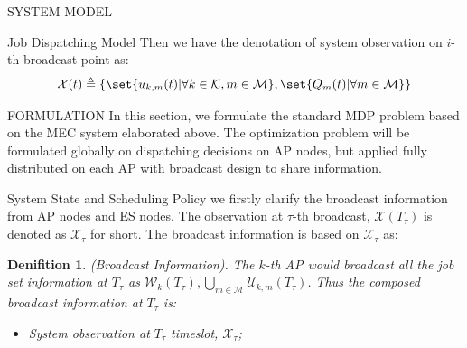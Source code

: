 \documentclass[10pt, conference, letterpaper]{IEEEtran}
\newtheorem{definition}{Denifition}
\newcommand{\define}{\triangleq}
\DeclarePairedDelimiter\set\{\}
\newcommand{\apSet}{\mathcal{K}}
\newcommand{\esSet}{\mathcal{M}}
\newcommand{\wSet}{\mathcal{W}}
\newcommand{\uSet}{\mathcal{U}}
\newcommand{\Obsv}{\mathcal{X}}
\begin{document}
\begin{section}{SYSTEM MODEL}
\begin{subsection}{Job Dispatching Model}
            Then we have the denotation of system observation on $i$-th broadcast point as:
            \begin{align}
                \Obsv(t) \define \{ \set{u_{k,m}(t)|\forall k\in\apSet,m\in\esSet}, \set{Q_m(t)|\forall m\in\esSet} \}
            \end{align}
        \end{subsection}
    \end{section}

    \begin{section}{FORMULATION}
        \label{sec:formulation}
        In this section, we formulate the standard MDP problem based on the MEC system elaborated above. The optimization problem will be formulated globally on dispatching decisions on AP nodes, but applied fully distributed on each AP with broadcast design to share information.

        \begin{subsection}{System State and Scheduling Policy}
            we firstly clarify the broadcast information from AP nodes and ES nodes.
            The observation at $\tau$-th broadcast, $\Obsv(T_\tau)$ is denoted as $\Obsv_\tau$ for short. The broadcast information is based on $\Obsv_\tau$ as:
            \begin{definition}(Broadcast Information).
                The $k$-th AP would broadcast all the job set information at $T_\tau$ as $\wSet_{k}(T_\tau), \bigcup\limits_{m\in\esSet}\uSet_{k,m}(T_\tau)$.
                Thus the composed broadcast information at $T_\tau$ is:
                \begin{itemize}
                    \item System observation at $T_\tau$ timeslot, $\Obsv_\tau$;
                \end{itemize}
            \end{definition}


\end{subsection}
\end{section}
\end{document}
